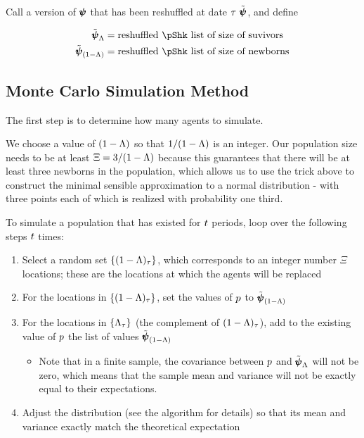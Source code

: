 \documentclass[\econtexRoot/BufferStockTheory.tex]{subfiles}
\begin{document}
Call a version of $\pmb{\psi}$ that has been reshuffled at date $\tau$ $\tilde{\pmb{\psi}}$, and define

\newcommand{\pShkOldRemix}{\tilde{\vctr{\DnsShk}}_{\Liv}}
\newcommand{\pShkNewRemix}{\tilde{\vctr{\DnsShk}}_{\Die}}
\begin{align}
  \pShkOldRemix & = \text{reshuffled $\pShk$ list of size of suvivors} 
  \\  \pShkNewRemix & = \text{reshuffled $\pShk$ list of size of newborns}
\end{align}

\subsection{Monte Carlo Simulation Method}

The first step is to determine how many agents to simulate.

\newcommand{\popMult}{\Xi}

We choose a value of $(1-\Lambda)$ so that $1/(1-\Lambda)$ is an integer.  Our population size needs to be at least $\popMult = 3/\Die$ because this guarantees that there will be at least three newborns in the population, which allows us to use the trick above to construct the minimal sensible approximation to a normal distribution - with three points each of which is realized with probability one third.

To simulate a population that has existed for $t$ periods, loop over the following steps $t$ times:
\begin{enumerate}
\item Select a random set $\{(1-\Lambda)_{\tau}\}$, which corresponds to an integer number $\popMult$ locations; these are the locations at which the agents will be replaced 
\item For the locations in $\{(1-\Lambda)_{\tau}\}$, set the values of $p$ to $\pShkNewRemix$
\item For the locations in $\{\Lambda_{\tau}\}$ (the complement of $(1-\Lambda)_{\tau}$), add to the existing value of $p$ the list of values $\pShkNewRemix$
  \begin{itemize}
  \item Note that in a finite sample, the covariance between $p$ and $\pShkOldRemix$ will not be zero, which means that the sample mean and variance will not be exactly equal to their expectations.
  \end{itemize}
\item Adjust the distribution (see the algorithm for details) so that its mean and variance exactly match the theoretical expectation    
\end{enumerate}
\end{document}
